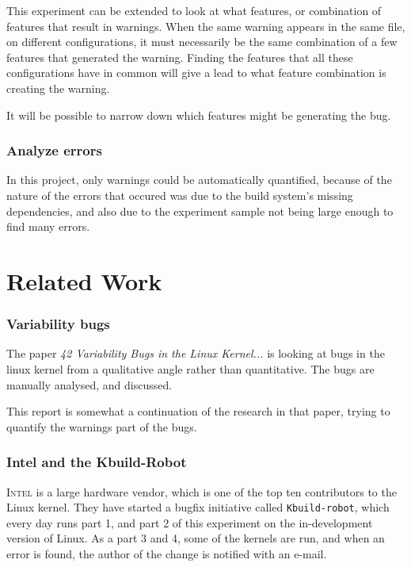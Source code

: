 \documentclass[a4paper,11pt]{report}
\begin{document}
This experiment can be extended to look at what features, or combination of 
features that result in warnings. When the same warning appears in the same 
file, on different configurations, it must necessarily be the same combination 
of a few features that generated the warning. Finding the features that all these
configurations have in common will give a lead to what feature combination is 
creating the warning.

It will be possible to narrow down which features might be generating the bug.


            \subsection*{Analyze errors}

In this project, only warnings could be automatically quantified, because of the
nature of the errors that occured was due to the build system's missing 
dependencies, and also due to the experiment sample not being large enough to 
find many errors.


            \newpage
            \chapter{Related Work}

            \subsection*{Variability bugs}
The paper \emph{42 Variability Bugs in the Linux Kernel...}\cite{42bugs} is 
looking at bugs in the linux kernel from a qualitative angle rather than 
quantitative.  The bugs are manually analysed, and discussed.

This report is somewhat a continuation of the research in that paper, trying to 
quantify the warnings part of the bugs.


            \subsection*{Intel and the Kbuild-Robot}

\textsc{Intel} is a large hardware vendor, which is one of the top ten 
contributors to the Linux kernel\cite{gkh}. They have started a bugfix 
initiative called \texttt{Kbuild-robot}, which every day runs part 1, and part 
2 of this experiment on the in-development version of Linux. As a part 3 and 4, 
some of the kernels are run, and when an error is found, the author of the change 
is notified with an e-mail.
\end{document}
